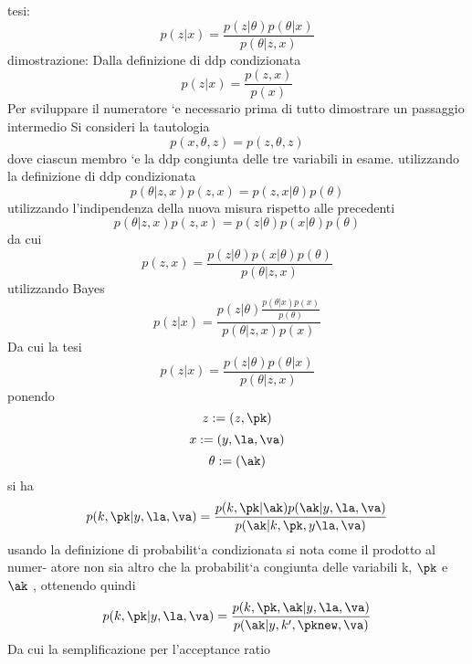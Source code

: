 tesi:
\begin{equation}
p(z|x)=\frac{p(z|\theta)p(\theta|x)}{p(\theta|z,x)}
\end{equation}
dimostrazione: Dalla definizione di ddp condizionata
\begin{equation}
p(z|x)=\frac{p(z,x)}{p(x)}
\end{equation}
Per sviluppare il numeratore `e necessario prima di tutto dimostrare un passaggio
intermedio Si consideri la tautologia
\begin{equation}
p(x,\theta,z)=p(z,\theta,z)
\end{equation}
dove ciascun membro `e la ddp congiunta delle tre variabili in esame. utilizzando la
definizione di ddp condizionata
\begin{equation}
p(\theta|z, x)p(z, x) = p(z, x|\theta)p(\theta)
\end{equation}
utilizzando l’indipendenza della nuova misura rispetto alle precedenti
\begin{equation}
p(\theta|z, x)p(z, x) = p(z|\theta)p(x|\theta)p(\theta)
\end{equation}
da cui
\begin{equation}
p(z,x)=\frac{p(z|\theta)p(x|\theta)p(\theta)
}{p(\theta|z,x)}
\end{equation}
utilizzando Bayes
\begin{equation}
p(z|x)=\frac{p(z|\theta)\frac{p(\theta|x)p(x)}{p(\theta)}}{p(\theta|z,x)p(x)}
\end{equation}
Da cui la tesi
\begin{equation}
p(z|x)=\frac{p(z|\theta)p(\theta|x)}{p(\theta|z,x)}
\end{equation}
ponendo
\begin{equation}
z:=(z,\pk)
\end{equation}
\begin{equation}
x:=(y,\la,\va)
\end{equation}
\begin{equation}
\theta:=(\ak)
\end{equation}
si ha
\begin{equation}
p(k,\pk|y,\la,\va)=\frac{p(k,\pk|\ak)p(\ak|y,\la,\va)}{p(\ak|k,\pk,y\la,\va)}
\end{equation}
usando la definizione di probabilit`a condizionata si nota come il prodotto al numer-
atore non sia altro che la probabilit`a congiunta delle variabili k, $\pk$ e $\ak$ , ottenendo
quindi
\begin{equation}
p(k,\pk|y,\la,\va)=\frac{p(k,\pk,\ak|y,\la,\va)}{p(\ak|y,k',\pknew,\va)}
\end{equation}
Da cui la semplificazione per l'acceptance ratio
\begin{equation}

\end{equation}